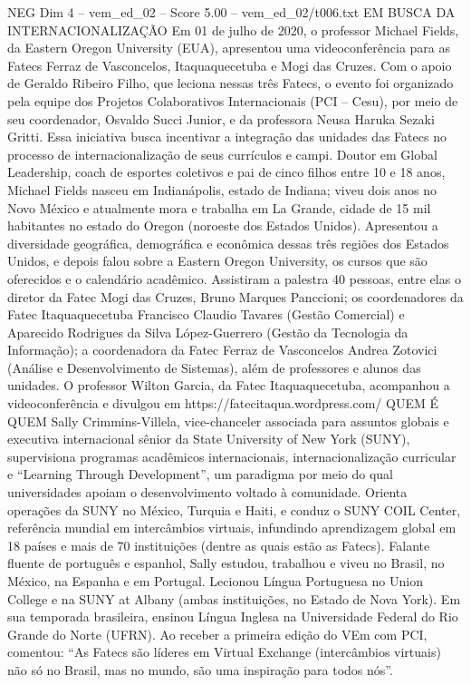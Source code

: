 \begin{textsample}{NEG Dim 4 – vem\_ed\_02 – Score 5.00 – vem\_ed\_02/t006.txt}  \label{ex:f4_neg_144}
EM BUSCA DA INTERNACIONALIZAÇÃO Em 01 de julho de 2020, o professor Michael Fields, da Eastern Oregon University (EUA), apresentou uma videoconferência para as Fatecs Ferraz de Vasconcelos, Itaquaquecetuba e Mogi das Cruzes.
Com o apoio de Geraldo Ribeiro Filho, que leciona nessas três Fatecs, o evento foi organizado pela equipe dos Projetos Colaborativos Internacionais (PCI – Cesu), por meio de seu coordenador, Osvaldo Succi Junior, e da professora Neusa Haruka Sezaki Gritti.
Essa iniciativa busca incentivar a integração das unidades das Fatecs no processo de internacionalização de seus currículos e campi.
Doutor em Global Leadership, coach de esportes coletivos e pai de cinco filhos entre 10 e 18 anos, Michael Fields nasceu em Indianápolis, estado de Indiana; viveu dois anos no Novo México e atualmente mora e trabalha em La Grande, cidade de 15 mil habitantes no estado do Oregon (noroeste dos Estados Unidos).
Apresentou a diversidade geográfica, demográfica e econômica dessas três regiões dos Estados Unidos, e depois falou sobre a Eastern Oregon University, os cursos que são oferecidos e o calendário acadêmico.
Assistiram a palestra 40 pessoas, entre elas o diretor da Fatec Mogi das Cruzes, Bruno Marques Panccioni; os coordenadores da Fatec Itaquaquecetuba Francisco Claudio Tavares (Gestão Comercial) e Aparecido Rodrigues da Silva López-Guerrero (Gestão da Tecnologia da Informação); a coordenadora da Fatec Ferraz de Vasconcelos Andrea Zotovici (Análise e Desenvolvimento de Sistemas), além de professores e alunos das unidades.
O professor Wilton Garcia, da Fatec Itaquaquecetuba, acompanhou a videoconferência e divulgou em https://fatecitaqua.wordpress.com/ QUEM É QUEM Sally Crimmins-Villela, vice-chanceler associada para assuntos globais e executiva internacional sênior da State University of New York (SUNY), supervisiona programas acadêmicos internacionais, internacionalização curricular e “Learning Through Development”, um paradigma por meio do qual universidades apoiam o desenvolvimento voltado à comunidade.
Orienta operações da SUNY no México, Turquia e Haiti, e conduz o SUNY COIL Center, referência mundial em intercâmbios virtuais, infundindo aprendizagem global em 18 países e mais de 70 instituições (dentre as quais estão as Fatecs).
Falante fluente de português e espanhol, Sally estudou, trabalhou e viveu no Brasil, no México, na Espanha e em Portugal.
Lecionou Língua Portuguesa no Union College e na SUNY at Albany (ambas instituições, no Estado de Nova York).
Em sua temporada brasileira, ensinou Língua Inglesa na Universidade Federal do Rio Grande do Norte (UFRN).
Ao receber a primeira edição do VEm com PCI, comentou: “As Fatecs são líderes em Virtual Exchange (intercâmbios virtuais) não só no Brasil, mas no mundo, são uma inspiração para todos nós”.

\end{textsample}
